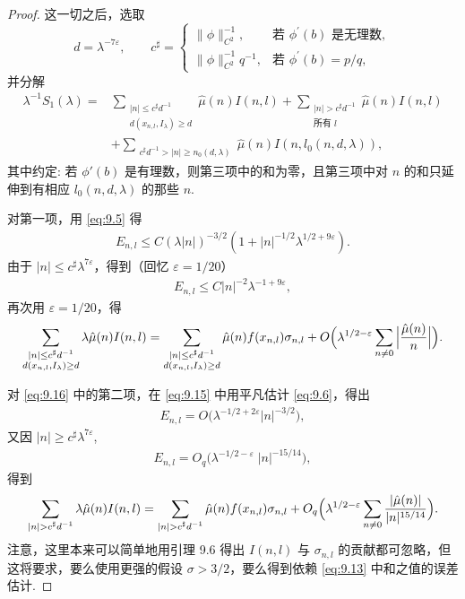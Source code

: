 \begin{proof}
这一切之后，选取
\begin{equation}\label{eq:9.16}
  d=\lambda^{-7\varepsilon},\qquad
  c^{\sharp}=\begin{cases}
    \|\phi\|_{C^{2}}^{-1}, & \text{若 } \phi^{\prime}(b) \text{ 是无理数},\\
    \|\phi\|_{C^{2}}^{-1}q^{-1}, & \text{若 } \phi^{\prime}(b)=p/q,
  \end{cases}
\end{equation}
并分解
\begin{align*}
  \lambda^{-1}S_{1}(\lambda)
  =&\sum_{\substack{|n|\leq c^{\sharp}d^{-1}\\ d(x_{n,l},I_\lambda)\geq d}}\hat{\mu}(n)I(n,l)
  +\sum_{\substack{|n|>c^{\sharp}d^{-1}\\ \text{所有 } l}}\hat{\mu}(n)I(n,l)\\
  &+\sum_{\substack{c^{\sharp}d^{-1}>|n|\geq n_{0}(d,\lambda)}}\hat{\mu}(n)I(n,l_{0}(n,d,\lambda)),
\end{align*}
其中约定: 若 $\phi'(b)$ 是有理数，则第三项中的和为零，且第三项中对 $n$ 的和只延伸到有相应 $l_0(n,d,\lambda)$ 的那些 $n$.

对第一项，用 \eqref{eq:9.5} 得
\begin{align*}
  E_{n,l}\leq C\left(\lambda\left|n\right|\right)^{-3/2}(1+\left|n\right|^{-1/2}\lambda^{1/2+9\varepsilon}).
\end{align*}
由于 $|n| \leq c^{\sharp}\lambda^{7\varepsilon}$，得到（回忆 $\varepsilon = 1/20$）
\begin{align*}
  E_{n,l}\leq C|n|^{-2}\lambda^{-1+9\varepsilon},
\end{align*}
再次用 $\varepsilon = 1/20$，得
\begin{align*}
  \sum_{\substack{|n|\leq c^{\sharp}d^{-1}\\ d(x_{n,l},I_\lambda)\geq d}}\lambda\hat{\mu}(n)I(n,l)
  =\sum_{\substack{|n|\leq c^{\sharp}d^{-1}\\ d(x_{n,l},I_\lambda)\geq d}}\hat{\mu}(n)f(x_{n,l})\sigma_{n,l}
  +O\Bigl(\lambda^{1/2-\varepsilon}\sum_{n\neq 0}\Big|\frac{\hat{\mu}(n)}{n}\Big|\Bigr).
\end{align*}

对 \eqref{eq:9.16} 中的第二项，在 \eqref{eq:9.15} 中用平凡估计 \eqref{eq:9.6}，得出
\begin{align*}
  E_{n,l}=O\bigl(\lambda^{-1/2+2\varepsilon}|n|^{-3/2}\bigr),
\end{align*}
又因 $|n| \geq c^{\sharp}\lambda^{7\varepsilon}$,
\begin{align*}
  E_{n,l}=O_{q}\bigl(\lambda^{-1/2-\varepsilon}\;|n|^{-15/14}\bigr),
\end{align*}
得到
\begin{align*}
  \sum_{\substack{|n|>c^{\sharp}d^{-1}}}\lambda\hat{\mu}(n)I(n,l)
  =\sum_{\substack{|n|>c^{\sharp}d^{-1}}}\hat{\mu}(n)f(x_{n,l})\sigma_{n,l}
  +O_{q}\Bigl(\lambda^{1/2-\varepsilon}\sum_{n\neq 0}\frac{|\hat{\mu}(n)|}{|n|^{15/14}}\Bigr).
\end{align*}
注意，这里本来可以简单地用引理 9.6 得出 $I(n, l)$ 与 $\sigma_{n,l}$ 的贡献都可忽略，但这将要求，要么使用更强的假设 $\sigma > 3/2$，要么得到依赖 \eqref{eq:9.13} 中和之值的误差估计.


\end{proof}

